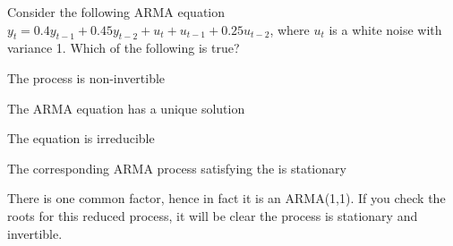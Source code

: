 
\begin{question}
Consider the following ARMA equation \(y_t= 0.4 y_{t-1} + 0.45 y_{t-2} + u_t + u_{t-1}+ 0.25 u_{t-2}\), where \(u_t\) is a white noise with variance 1. Which of the following is true?
\begin{answerlist}
  \item The process is non-invertible
  \item The ARMA equation has a unique solution
  \item The equation is irreducible
  \item The corresponding ARMA process satisfying the is stationary
\end{answerlist}
\end{question}

\begin{solution}
There is one common factor, hence in fact it is an ARMA(1,1). If you check the roots for this reduced process, it will be clear the process is stationary and invertible.
\end{solution}

